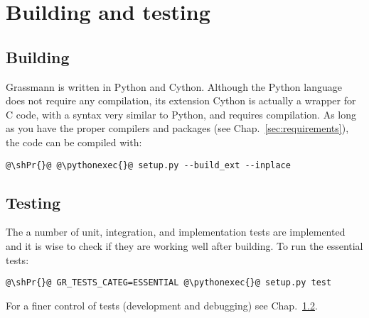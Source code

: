 \hypertarget{chap:buildtest}{}
\chapter{Building and testing}
\label{sec:buildtest}
\chapterauthor{}


\section{Building}

Grassmann is written in Python and Cython.
Although the Python language does not require any compilation,
its extension Cython is actually a wrapper for C code,
with a syntax very similar to Python, and requires compilation.
As long as you have the proper compilers and packages (see Chap.~\ref{sec:requirements}),
the code can be compiled with:
\begin{lstlisting}[style=shstyint]
@\shPr{}@ @\pythonexec{}@ setup.py --build_ext --inplace
\end{lstlisting}

\section{Testing}

The a number of unit, integration, and implementation tests are implemented and it is wise to check if they are working well after building.
To run the essential tests:
\begin{lstlisting}[style=shstyint]
@\shPr{}@ GR_TESTS_CATEG=ESSENTIAL @\pythonexec{}@ setup.py test
\end{lstlisting}

For a finer control of tests (development and debugging) see Chap.~\ref{}.



